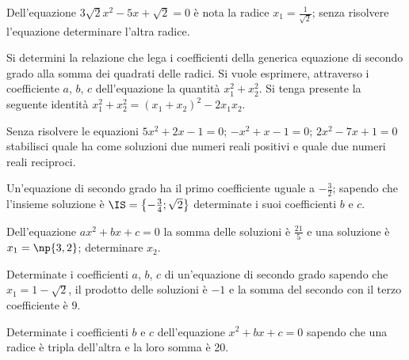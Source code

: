 \begin{esercizio}
 \label{ese:3.80}
Dell'equazione $3 \sqrt{2} x^{2}-5 x + \sqrt{2} = 0$ è nota la radice $x_{1} = \frac{1}{\sqrt{2}}$; senza risolvere l'equazione determinare l'altra radice.
\end{esercizio}

\begin{esercizio}
 \label{ese:3.81}
Si determini la relazione che lega i coefficienti della generica equazione di secondo grado alla somma dei quadrati delle radici. Si vuole esprimere,
attraverso i coefficiente $a$, $b$, $c$ dell'equazione la quantità $x_{1}^{2} + x_{2}^{2}$. Si tenga presente la seguente identità $x_{1}^{2} + x_{2}^{2} = (x_{1} + x_{2} )^{2}-2 x_{1} x_{2}$.
\end{esercizio}

\begin{esercizio}
 \label{ese:3.82}
Senza risolvere le equazioni $ 5 x^{2} + 2 x-1 = 0$; $-x^{2} + x-1 = 0$; $2 x^{2}-7 x +1 = 0$ stabilisci quale ha come soluzioni due numeri reali positivi e quale due numeri reali reciproci.
\end{esercizio}

\begin{esercizio}
 \label{ese:3.83}
Un'equazione di secondo grado ha il primo coefficiente uguale a $- \frac{3}{2}$; sapendo che l'insieme soluzione è $\IS = \left\{-\frac{3}{4};\sqrt{2} \right\}$
determinate i suoi coefficienti $b$ e $c$.
\end{esercizio}

\begin{esercizio}
 \label{ese:3.84}
Dell'equazione $a x^{2} + b x + c = 0$ la somma delle soluzioni è $\frac{21}{5}$ e una soluzione è $x_{1} = \np{3,2}$; determinare $x_{2}$.
\end{esercizio}

\begin{esercizio}
 \label{ese:3.85}
Determinate i coefficienti $a$, $b$, $c$ di un'equazione di secondo grado sapendo che $x_{1} = 1-\sqrt{2}$, il prodotto delle soluzioni è $-1$
e la somma del secondo con il terzo coefficiente è $9$.
\end{esercizio}

\begin{esercizio}
 \label{ese:3.86}
Determinate i coefficienti $b$ e $c$ dell'equazione $x^{2} + b x + c = 0$ sapendo che una radice è tripla dell'altra e la loro somma è 20.
\end{esercizio}

